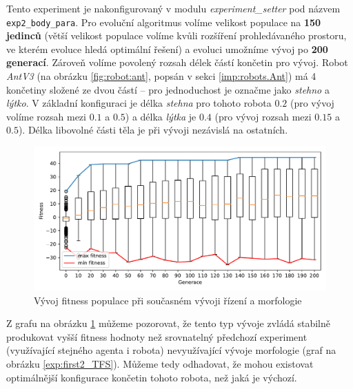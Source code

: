 Tento experiment je nakonfigurovaný v modulu \emph{experiment\_setter} pod
názvem \texttt{exp2\_body\_para}. Pro evoluční algoritmus volíme velikost
populace na \textbf{150 jedinců} (větší velikost populace volíme kvůli
rozšíření prohledávaného prostoru, ve kterém evoluce hledá optimální řešení) a
evoluci umožníme vývoj po \textbf{200 generací}. Zároveň volíme povolený rozsah
délek částí končetin pro vývoj. Robot \emph{AntV3} (na obrázku
\ref{fig:robot:ant}, popsán v sekci \ref{imp:robots.Ant}) má 4 končetiny
složené ze dvou částí -- pro jednoduchost je označme jako \emph{stehno} a
\emph{lýtko}. V základní konfiguraci je délka \emph{stehna} pro tohoto robota
$0.2$ (pro vývoj volíme rozsah mezi $0.1$ a $0.5$) a délka \emph{lýtka} je
$0.4$ (pro vývoj rozsah mezi $0.15$ a $0.5$). Délka libovolné části těla je při
vývoji nezávislá na ostatních.

\begin{figure}[h!]
    \includegraphics[width=1\textwidth]{../img/experiment2_para_10ticks.pdf}
    \caption{Vývoj fitness populace při současném vývoji řízení a morfologie}
    \label{exp:exp2_para}
\end{figure}

Z grafu na obrázku \ref{exp:exp2_para} můžeme pozorovat, že tento typ vývoje
zvládá stabilně produkovat vyšší fitness hodnoty než srovnatelný předchozí
experiment (využívající stejného agenta i robota) nevyužívající vývoje
morfologie (graf na obrázku \ref{exp:first2_TFS}). Můžeme tedy odhadovat, že
mohou existovat optimálnější konfigurace končetin tohoto robota, než jaká je
výchozí.


